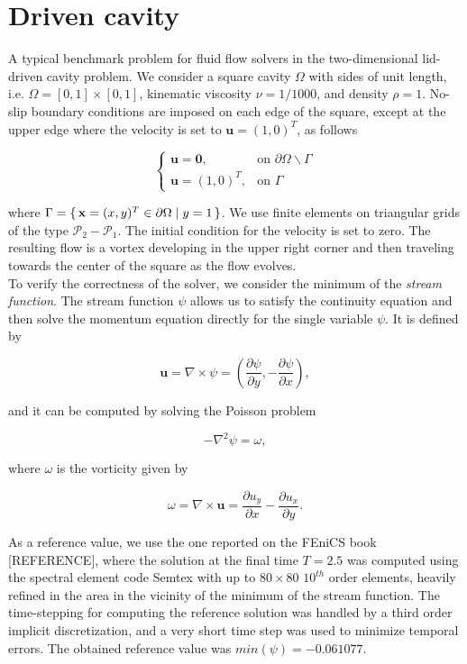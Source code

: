 \documentclass[11pt,a4paper,titlepage]{report}
\begin{document}
\section{Driven cavity}

A typical benchmark problem for fluid flow solvers in the two-dimensional lid-driven cavity problem. We consider a square cavity $\Omega$ with sides of unit length, i.e. $\Omega = [0,1] \times [0,1]$, kinematic viscosity $\nu = 1/1000$, and density $\rho = 1$. No-slip boundary conditions are imposed on each edge of the square, except at the upper edge where the velocity is set to $\mathbf{u} = (1,0)^T$, as follows

\[
\begin{cases}
\mathbf{u = 0}, & \mbox{on } \partial \Omega \backslash \Gamma \\
\mathbf{u} = (1,0)^T, & \mbox{on } \Gamma
\end{cases}
\]

where $ \Gamma = \set{ \mathbf{x} = (x,y)^T \in \partial \Omega | y = 1}$. We use finite elements on triangular grids of the type $\mathcal{P}_2-\mathcal{P}_1$. The initial condition for the velocity is set to zero. The resulting flow is a vortex developing in the upper right corner and then traveling towards the center of the square as the flow evolves. \\
To verify the correctness of the solver, we consider the minimum of the \textit{stream function}. The stream function $\psi$ allows us to satisfy the continuity equation and then solve the momentum equation directly for the single variable $\psi$. It is defined by

\[
\mathbf{u} = \nabla \times \psi = (\frac{\partial \psi}{\partial y} , - \frac{\partial \psi }{\partial x}),
\]

and it can be computed by solving the Poisson problem

\[
- \nabla^2 \psi = \omega,
\]

where $\omega$ is the vorticity given by

\[
\omega = \nabla \times \mathbf{u} = \frac{\partial u_y}{\partial x} - \frac{\partial u_x}{\partial y}.
\]


As a reference value, we use the one reported on the FEniCS book [REFERENCE], where the solution at the final time $T = 2.5$ was computed using the spectral element code Semtex with up to $80 \times 80$ $10^{th}$ order elements, heavily refined in the area in the vicinity of the minimum of the stream function. The time-stepping for computing the reference solution was handled by a third order implicit discretization, and a very short time step was used to minimize temporal errors.  The obtained reference value was $min(\psi) = -0.061 077$.
\end{document}
